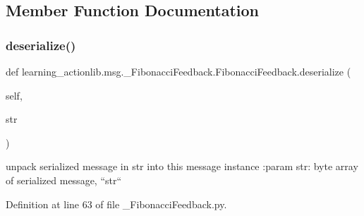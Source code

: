 \subsection{Member Function Documentation}
\mbox{\label{classlearning__actionlib_1_1msg_1_1__FibonacciFeedback_1_1FibonacciFeedback_a09711fb93a20ed8d656c5b1353024ff1}} 
\subsubsection{\texorpdfstring{deserialize()}{deserialize()}}
{\footnotesize\ttfamily def learning\+\_\+actionlib.\+msg.\+\_\+\+Fibonacci\+Feedback.\+Fibonacci\+Feedback.\+deserialize (\begin{DoxyParamCaption}\item[{}]{self,  }\item[{}]{str }\end{DoxyParamCaption})}

\begin{DoxyVerb}unpack serialized message in str into this message instance
:param str: byte array of serialized message, ``str``
\end{DoxyVerb}
 

Definition at line 63 of file \+\_\+\+Fibonacci\+Feedback.\+py.


